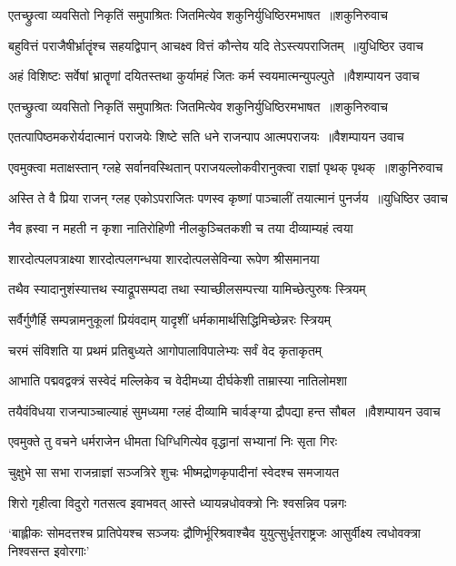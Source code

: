\threelineshloka
{एतच्छ्रुत्वा व्यवसितो निकृतिं समुपाश्रितः}
{जितमित्येव शकुनिर्युधिष्ठिरमभाषत ॥शकुनिरुवाच}
{}


\twolineshloka
{बहुवित्तं पराजैषीर्भ्रातॄंश्च सहयद्विपान्}
{आचक्ष्व वित्तं कौन्तेय यदि तेऽस्त्यपराजितम् ॥युधिष्ठिर उवाच}


\twolineshloka
{अहं विशिष्टः सर्वेषां भ्रातॄणां दयितस्तथा}
{कुर्यामहं जितः कर्म स्वयमात्मन्युपल्पुते ॥वैशम्पायन उवाच}


\threelineshloka
{एतच्छ्रुत्वा व्यवसितो निकृतिं समुपाश्रितः}
{जितमित्येव शकुनिर्युधिष्ठिरमभाषत ॥शकुनिरुवाच}
{}


\twolineshloka
{एतत्पापिष्ठमकरोर्यदात्मानं पराजयेः}
{शिष्टे सति धने राजन्पाप आत्मपराजयः ॥वैशम्पायन उवाच}


\twolineshloka
{एवमुक्त्वा मताक्षस्तान् ग्लहे सर्वानवस्थितान्}
{पराजयल्लोकवीरानुक्त्वा राज्ञां पृथक् पृथक् ॥शकुनिरुवाच}


\twolineshloka
{अस्ति ते वै प्रिया राजन् ग्लह एकोऽपराजितः}
{पणस्व कृष्णां पाञ्चालीं तयात्मानं पुनर्जय ॥युधिष्ठिर उवाच}


\twolineshloka
{नैव ह्रस्वा न महती न कृशा नातिरोहिणी}
{नीलकुञ्चितकशी च तया दीव्याम्यहं त्वया}


\twolineshloka
{शारदोत्पलपत्राक्ष्या शारदोत्पलगन्धया}
{शारदोत्पलसेविन्या रूपेण श्रीसमानया}


\twolineshloka
{तथैव स्यादानुशंस्यात्तथ स्याद्रूपसम्पदा}
{तथा स्याच्छीलसम्पत्त्या यामिच्छेत्पुरुषः स्त्रियम्}


\twolineshloka
{सर्वैर्गुणैर्हि सम्पन्नामनुकूलां प्रियंवदाम्}
{यादृशीं धर्मकामार्थसिद्धिमिच्छेन्नरः स्त्रियम्}


\twolineshloka
{चरमं संविशति या प्रथमं प्रतिबुध्यते}
{आगोपालाविपालेभ्यः सर्वं वेद कृताकृतम्}


\twolineshloka
{आभाति पद्मवद्वक्त्रं सस्वेदं मल्लिकेव च}
{वेदीमध्या दीर्घकेशी ताम्रास्या नातिलोमशा}


\twolineshloka
{तयैवंविधया राजन्पाञ्चाल्याहं सुमध्यमा}
{ग्लहं दीव्यामि चार्वङ्ग्या द्रौपद्या हन्त सौबल ॥वैशम्पायन उवाच}


\twolineshloka
{एवमुक्ते तु वचने धर्मराजेन धीमता}
{धिग्धिगित्येव वृद्धानां सभ्यानां निः सृता गिरः}


\twolineshloka
{चुक्षुभे सा सभा राजन्राज्ञां सञ्जत्रिरे शुचः}
{भीष्मद्रोणकृपादीनां स्वेदश्च समजायत}


\twolineshloka
{शिरो गृहीत्वा विदुरो गतसत्व इवाभवत्}
{आस्ते ध्यायन्नधोवक्त्रो निः श्वसन्निव पन्नगः}


\threelineshloka
{`बाह्लीकः सोमदत्तश्च प्रातिपेयश्च सञ्जयः}
{द्रौणिर्भूरिश्रवाश्चैव युयुत्सुर्धृतराष्ट्रजः}
{आसुर्वीक्ष्य त्वधोवक्त्रा निश्वसन्त इवोरगाः'}


